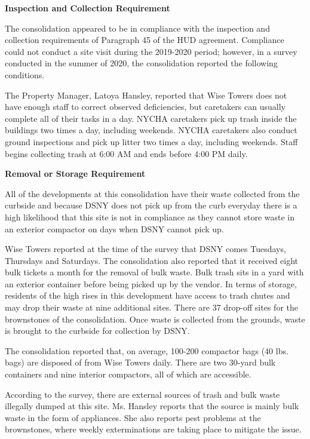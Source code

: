 

\textbf{Inspection and Collection Requirement}

The consolidation appeared to be in compliance with the inspection and collection requirements of Paragraph 45 of the HUD agreement. Compliance could not conduct a site visit during the 2019-2020 period; however, in a survey conducted in the summer of 2020, the consolidation reported the following conditions.

The Property Manager, Latoya Hansley, reported that Wise Towers does not have enough staff to correct observed deficiencies, but caretakers can usually complete all of their tasks in a day. NYCHA caretakers pick up trash inside the buildings two times a day, including weekends. NYCHA caretakers also conduct ground inspections and pick up litter two times a day, including weekends. Staff begins collecting trash at 6:00 AM and ends before 4:00 PM daily.

\textbf{Removal or Storage Requirement}

All of the developments at this consolidation have their waste collected from the curbside and because DSNY does not pick up from the curb everyday there is a high likelihood that this site is not in compliance as they cannot store waste in an exterior compactor on days when DSNY cannot pick up.

Wise Towers reported at the time of the survey that DSNY comes Tuesdays, Thursdays and Saturdays. The consolidation also reported that it received eight bulk tickets a month for the removal of bulk waste. Bulk trash sits in a yard with an exterior container before being picked up by the vendor. In terms of storage, residents of the high rises in this development have access to trash chutes and may drop their waste at nine additional sites. There are 37 drop-off sites for the brownstones of the consolidation. Once waste is collected from the grounds, waste is brought to the curbside for collection by DSNY. 

The consolidation reported that, on average, 100-200 compactor bags (40 lbs. bags) are disposed of from Wise Towers daily. There are two 30-yard bulk containers and nine interior compactors, all of which are accessible. 

According to the survey, there are external sources of trash and bulk waste illegally dumped at this site. Ms. Hansley reports that the source is mainly bulk waste in the form of appliances. She also reports pest problems at the brownstones, where weekly exterminations are taking place to mitigate the issue. 